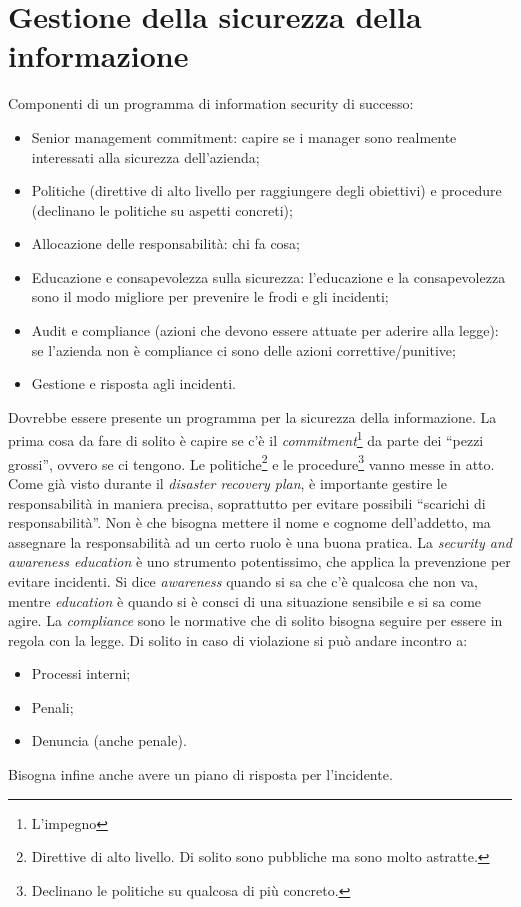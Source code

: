 \section{Gestione della sicurezza della informazione}

Componenti di un programma di information security di successo:

\begin{itemize}
\item Senior management commitment: capire se i manager sono realmente interessati
alla sicurezza dell'azienda;
\item Politiche (direttive di alto livello per raggiungere degli obiettivi) e
procedure (declinano le politiche su aspetti concreti);
\item Allocazione delle responsabilità: chi fa cosa;
\item Educazione e consapevolezza sulla sicurezza: l'educazione e la
consapevolezza sono il modo migliore per prevenire le frodi e gli incidenti;
\item Audit e compliance (azioni che devono essere attuate per aderire alla
legge): se l'azienda non è compliance ci sono delle azioni correttive/punitive;
\item Gestione e risposta agli incidenti.
\end{itemize}

Dovrebbe essere presente un programma per la sicurezza della informazione. La
prima cosa da fare di solito è capire se c'è il
\textit{commitment}\footnote{L'impegno} da parte dei ``pezzi grossi'', ovvero
se ci tengono. Le politiche\footnote{Direttive di alto livello. Di solito sono
pubbliche ma sono molto astratte.} e le procedure\footnote{Declinano le
politiche su qualcosa di più concreto.} vanno messe in atto. Come già visto
durante il \textit{disaster recovery plan}, è importante gestire le
responsabilità in maniera precisa, soprattutto per evitare possibili ``scarichi
di responsabilità''. Non è che bisogna mettere il nome e cognome dell'addetto,
ma assegnare la responsabilità ad un certo ruolo è una buona pratica. La
\textit{security and awareness education} è uno strumento potentissimo, che
applica la prevenzione per evitare incidenti. Si dice \textit{awareness} quando
si sa che c'è qualcosa che non va, mentre \textit{education} è quando si è
consci di una situazione sensibile e si sa come agire.
La \textit{compliance} sono le normative che di solito bisogna seguire per
essere in regola con la legge. Di solito in caso di violazione si può andare
incontro a:
\begin{itemize}
  \item Processi interni;
  \item Penali;
  \item Denuncia (anche penale).
\end{itemize}
Bisogna infine anche avere un piano di risposta per l'incidente.


